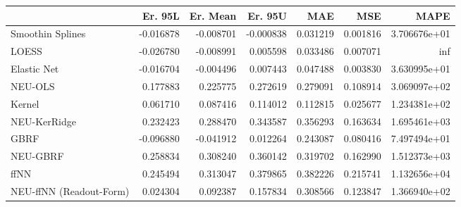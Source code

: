 \begin{tabular}{lrrrrrr}
\toprule
{} &   Er. 95L &  Er. Mean &   Er. 95U &       MAE &       MSE &          MAPE \\
\midrule
Smoothin Splines        & -0.016878 & -0.008701 & -0.000838 &  0.031219 &  0.001816 &  3.706676e+01 \\
LOESS                   & -0.026780 & -0.008991 &  0.005598 &  0.033486 &  0.007071 &           inf \\
Elastic Net             & -0.016704 & -0.004496 &  0.007443 &  0.047488 &  0.003830 &  3.630995e+01 \\
NEU-OLS                 &  0.177883 &  0.225775 &  0.272619 &  0.279091 &  0.108914 &  3.069097e+02 \\
Kernel                  &  0.061710 &  0.087416 &  0.114012 &  0.112815 &  0.025677 &  1.234381e+02 \\
NEU-KerRidge            &  0.232423 &  0.288470 &  0.343587 &  0.356293 &  0.163634 &  1.695461e+03 \\
GBRF                    & -0.096880 & -0.041912 &  0.012264 &  0.243087 &  0.080416 &  7.497494e+01 \\
NEU-GBRF                &  0.258834 &  0.308240 &  0.360142 &  0.319702 &  0.162990 &  1.512373e+03 \\
ffNN                    &  0.245494 &  0.313047 &  0.379865 &  0.382226 &  0.215741 &  1.132656e+04 \\
NEU-ffNN (Readout-Form) &  0.024304 &  0.092387 &  0.157834 &  0.308566 &  0.123847 &  1.366940e+02 \\
\bottomrule
\end{tabular}

